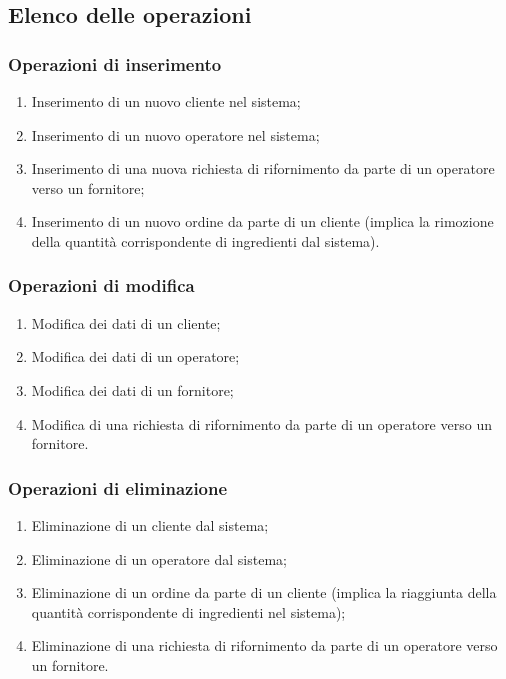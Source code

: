 \documentclass[12pt,a4paper]{article}
\begin{document}
    \subsection{Elenco delle operazioni}
    \subsubsection{Operazioni di inserimento}
    \begin{enumerate}[leftmargin=2.8em,label=\textbf{Op.\arabic*}]
        \item Inserimento di un nuovo cliente nel sistema;
        \item Inserimento di un nuovo operatore nel sistema;
        \item Inserimento di una nuova richiesta di rifornimento da parte di un operatore verso un fornitore;
        \item Inserimento di un nuovo ordine da parte di un cliente (implica la rimozione della quantità corrispondente di ingredienti dal sistema).
    \end{enumerate}

    \subsubsection{Operazioni di modifica}
    \begin{enumerate}[leftmargin=2.8em,label=\textbf{Op.\arabic*}]
        \item Modifica dei dati di un cliente;
        \item Modifica dei dati di un operatore;
        \item Modifica dei dati di un fornitore;
        \item Modifica di una richiesta di rifornimento da parte di un operatore verso un fornitore.
    \end{enumerate}

    \subsubsection{Operazioni di eliminazione}
    \begin{enumerate}[leftmargin=2.8em,label=\textbf{Op.\arabic*}]
        \item Eliminazione di un cliente dal sistema;
        \item Eliminazione di un operatore dal sistema;
        \item Eliminazione di un ordine da parte di un cliente (implica la riaggiunta della quantità corrispondente di ingredienti nel sistema);
        \item Eliminazione di una richiesta di rifornimento da parte di un operatore verso un fornitore.
    \end{enumerate}
\end{document}
